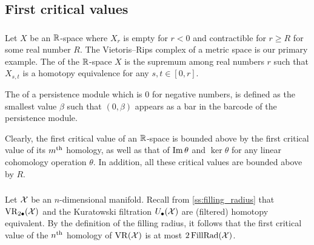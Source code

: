 
\subsection{First critical values}\label{sub:general_barcodes}


\subsubsection{}\label{subsub:first_critical_value}\label{subsub:beta v.s. fillrad}

Let $X$ be an $\mathbb{R}$-space where $X_r$ is empty for $r<0$ and contractible for $r \geq R$ for some real number $R$.
The Vietoris--Rips complex of a metric space is our primary example.
The  of the $\mathbb{R}$-space $X$ is the supremum among real numbers $r$ such that $X_{s,t}$ is a homotopy equivalence for any $s,t \in [0,r]$.

The  of a persistence module which is \(0\) for negative numbers, is defined as the smallest value \(\beta\) such that \((0, \beta)\) appears as a bar in the barcode of the persistence module.

Clearly, the first critical value of an $\mathbb{R}$-space is bounded above by the first critical value of its $m^{\mathrm{th}}$ homology, as well as that of \(\operatorname{Im}\theta\) and \(\ker\theta\) for any linear cohomology operation $\theta$.
In addition, all these critical values are bounded above by $R$.

\subsubsection{}

Let $\mathcal{X}$ be an $n$-dimensional manifold.
Recall from \cref{ss:filling_radius} that $\operatorname{VR}_{2\bullet}(\mathcal{X})$ and the Kuratowski filtration $U_\bullet(\mathcal{X})$ are (filtered) homotopy equivalent.
By the definition of the filling radius, it follows that the first critical value of the $n^{\mathrm{th}}$ homology of $\operatorname{VR}(\mathcal{X})$ is at most $2\operatorname{FillRad}(\mathcal{X})$.

